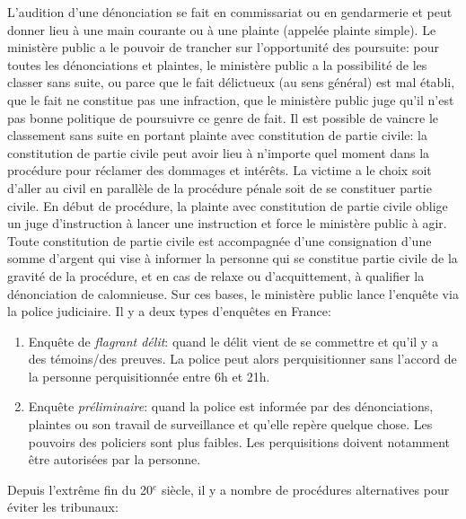 \documentclass[math]{cours}
\begin{document}
L'audition d'une dénonciation se fait en commissariat ou en gendarmerie et peut donner lieu à une main courante ou à une plainte (appelée plainte simple).
Le ministère public a le pouvoir de trancher sur l'opportunité des poursuite:
pour toutes les dénonciations et plaintes, le ministère public a la possibilité de les classer sans suite,
ou parce que le fait délictueux (au sens général) est mal établi, que le fait ne constitue pas une infraction,
que le ministère public juge qu'il n'est pas bonne politique de poursuivre ce genre de fait.
Il est possible de vaincre le classement sans suite en portant plainte avec constitution de partie civile:
la constitution de partie civile peut avoir lieu à n'importe quel moment dans la procédure pour réclamer des dommages et intérêts.
La victime a le choix soit d'aller au civil en parallèle de la procédure pénale soit de se constituer partie civile.
En début de procédure, la plainte avec constitution de partie civile oblige un juge d'instruction à lancer une instruction et force le ministère public à agir.
Toute constitution de partie civile est accompagnée d'une consignation d'une somme d'argent qui vise à informer la personne qui se constitue partie civile de la gravité de la procédure, et en cas de relaxe ou d'acquittement, à qualifier la dénonciation de calomnieuse.
Sur ces bases, le ministère public lance l'enquête via la police judiciaire.
Il y a deux types d'enquêtes en France:
\begin{enumerate}
	\item Enquête de \emph{flagrant délit}: quand le délit vient de se commettre et qu'il y a des témoins/des preuves.
	      La police peut alors perquisitionner sans l'accord de la personne perquisitionnée entre 6h et 21h.
	\item Enquête \emph{préliminaire}: quand la police est informée par des dénonciations, plaintes ou son travail de surveillance et qu'elle repère quelque chose.
	      Les pouvoirs des policiers sont plus faibles.
	      Les perquisitions doivent notamment être autorisées par la personne.
\end{enumerate}
Depuis l'extrême fin du 20$^{e}$ siècle, il y a nombre de procédures alternatives pour éviter les tribunaux:
\end{document}
